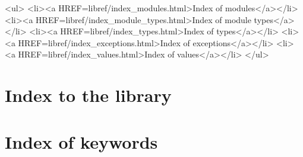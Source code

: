 \ifouthtml
\begin{rawhtml}
<ul>
<li><a HREF=libref/index_modules.html>Index of modules</a></li>
<li><a HREF=libref/index_module_types.html>Index of module types</a></li>
<li><a HREF=libref/index_types.html>Index of types</a></li>
<li><a HREF=libref/index_exceptions.html>Index of exceptions</a></li>
<li><a HREF=libref/index_values.html>Index of values</a></li>
</ul>
\end{rawhtml}
\else
\chapter*{Index to the library}
\fi
\chapter*{Index of keywords}
